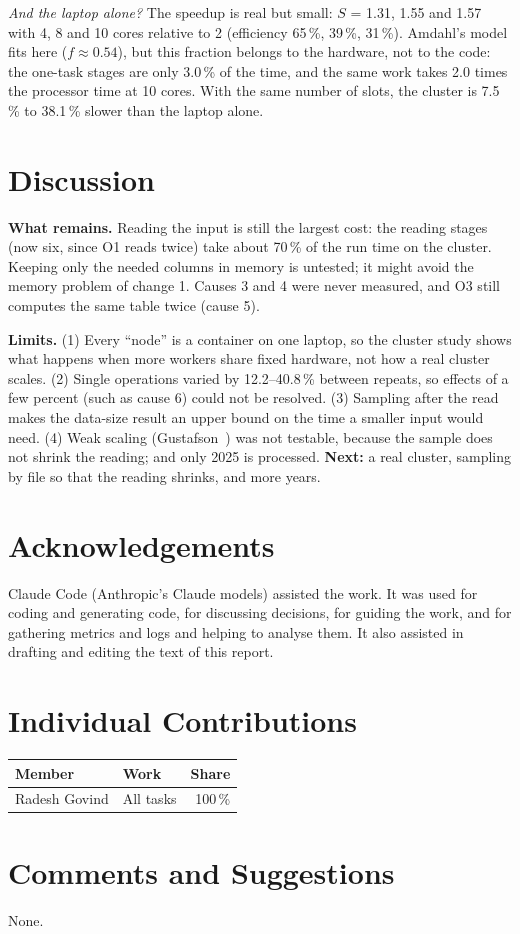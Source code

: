 \documentclass[sigconf]{acmart}
\begin{document}
\emph{And the laptop alone?} The speedup is real but small: $S$ = 1.31, 1.55 and 1.57 with 4, 8
and 10 cores relative to 2 (efficiency 65\,\%, 39\,\%, 31\,\%). Amdahl's model fits here
($f \approx 0.54$), but this fraction belongs to the hardware, not to the code: the one-task
stages are only 3.0\,\% of the time, and the same work takes 2.0 times the processor time at 10
cores. With the same number of slots, the cluster is 7.5\,\% to 38.1\,\% slower than the laptop
alone.

\section{Discussion}

\textbf{What remains.} Reading the input is still the largest cost: the reading stages (now
six, since O1 reads twice) take about 70\,\% of the run time on the cluster. Keeping only the
needed columns in memory is untested; it might avoid the memory problem of change 1. Causes 3
and 4 were never measured, and O3 still computes the same table twice (cause 5).

\textbf{Limits.} (1) Every ``node'' is a container on one laptop, so the cluster study shows
what happens when more workers share fixed hardware, not how a real cluster scales. (2) Single
operations varied by 12.2--40.8\,\% between repeats, so effects of a few percent (such as cause
6) could not be resolved. (3) Sampling after the read makes the data-size result an upper bound
on the time a smaller input would need. (4) Weak scaling (Gustafson~\cite{gustafson1988}) was
not testable, because the sample does not shrink the reading; and only 2025 is processed.
\textbf{Next:} a real cluster, sampling by file so that the reading shrinks, and more years.

\clearpage



\section*{Acknowledgements}
Claude Code (Anthropic's Claude models) assisted the work. It was used for coding and
generating code, for discussing decisions, for guiding the work, and for gathering metrics and
logs and helping to analyse them. It also assisted in drafting and editing the text of this
report.

\section*{Individual Contributions}
\begin{tabular}{@{}llr@{}}
\toprule
Member & Work & Share \\
\midrule
Radesh Govind & All tasks & 100\,\% \\
\bottomrule
\end{tabular}

\section*{Comments and Suggestions}
None.
\end{document}
